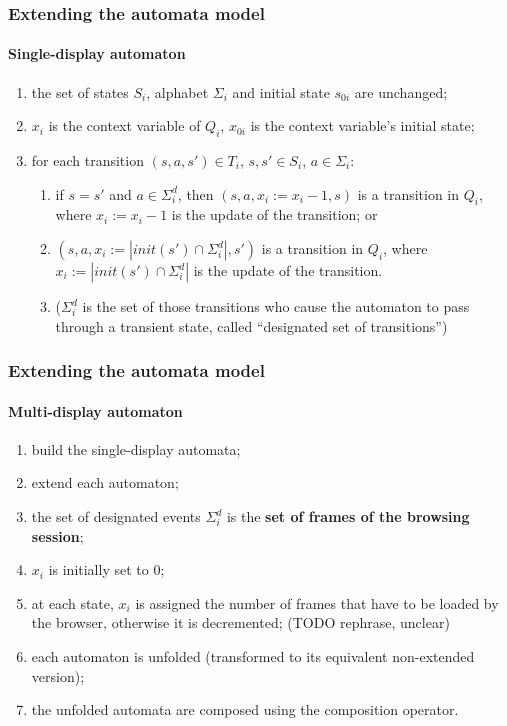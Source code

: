\documentclass[usenames,dvipsnames]{beamer}
\theoremstyle{definition}
\begin{document}
\begin{frame}
  \frametitle{Extending the automata model}
  \framesubtitle{Single-display automaton}

  \begin{enumerate}
    \item the set of states $S_i$, alphabet $\Sigma_i$ and initial state $s_{0i}$ are unchanged;
    \item $x_i$ is the context variable of $Q_i$, $x_{0i}$ is the context variable's initial state;
    \item for each transition $(s,a,s')\in T_i$, $s,s'\in S_i$, $a\in\Sigma_i$:
      \begin{enumerate}
        \item if $s=s'$ and $a\in\Sigma^d_i$, then $(s,a,x_i := x_i - 1,s)$ is a transition in $Q_i$, where $x_i := x_i - 1$ is the update of the transition; or
        \item $(s,a,x_i := |init(s')\cap \Sigma^d_i|,s')$ is a transition in $Q_i$, where $x_i := |init(s')\cap\Sigma^d_i|$ is the update of the transition.
        \item ($\Sigma^d_i$ is the set of those transitions who cause the automaton to pass through a transient state, called ``designated set of transitions'')
      \end{enumerate}
  \end{enumerate}
\end{frame}


\begin{frame}
  \frametitle{Extending the automata model}
  \framesubtitle{Multi-display automaton}

  \begin{enumerate}
    \item build the single-display automata;
    \item extend each automaton;
    \item the set of designated events $\Sigma^d_i$ is the \textbf{set of frames of the browsing session};
    \item $x_i$ is initially set to 0;
    \item at each state, $x_i$ is assigned the number of frames that have to be loaded by the browser, otherwise it is decremented; (TODO rephrase, unclear)
    \item each automaton is unfolded (transformed to its equivalent non-extended version);
    \item the unfolded automata are composed using the composition operator.
  \end{enumerate}
\end{frame}
\end{document}
